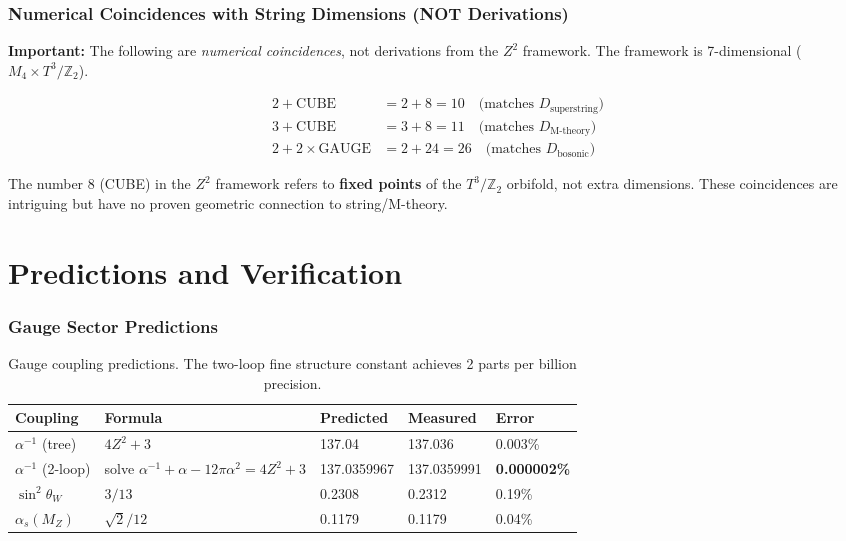 \documentclass[11pt,a4paper]{article}
\theoremstyle{plain}
\theoremstyle{definition}
\theoremstyle{remark}
\newcommand{\MZ}{M_Z}
\newcommand{\alphas}{\alpha_s}
\newcommand{\thetaW}{\theta_W}
\newcommand{\CUBE}{\text{CUBE}}
\newcommand{\GAUGE}{\text{GAUGE}}
\begin{document}
\section{Numerical Coincidences with String Dimensions (NOT Derivations)}

\textbf{Important:} The following are \emph{numerical coincidences}, not derivations from the $Z^2$ framework. The framework is 7-dimensional ($M_4 \times T^3/\mathbb{Z}_2$).

\begin{align}
2 + \CUBE &= 2 + 8 = 10 \quad \text{(matches } D_{\text{superstring}}\text{)} \\
3 + \CUBE &= 3 + 8 = 11 \quad \text{(matches } D_{\text{M-theory}}\text{)} \\
2 + 2 \times \GAUGE &= 2 + 24 = 26 \quad \text{(matches } D_{\text{bosonic}}\text{)}
\end{align}

The number 8 (CUBE) in the $Z^2$ framework refers to \textbf{fixed points} of the $T^3/\mathbb{Z}_2$ orbifold, not extra dimensions. These coincidences are intriguing but have no proven geometric connection to string/M-theory.

\part{Predictions and Verification}

\section{Gauge Sector Predictions}

\begin{table}[h!]
\centering
\begin{tabular}{lllll}
\toprule
\textbf{Coupling} & \textbf{Formula} & \textbf{Predicted} & \textbf{Measured} & \textbf{Error} \\
\midrule
$\alpha^{-1}$ (tree) & $4Z^2 + 3$ & 137.04 & 137.036 & 0.003\% \\
$\alpha^{-1}$ (2-loop) & solve $\alpha^{-1} + \alpha - 12\pi\alpha^2 = 4Z^2 + 3$ & 137.0359967 & 137.0359991 & \textbf{0.000002\%} \\
$\sin^2\thetaW$ & $3/13$ & 0.2308 & 0.2312 & 0.19\% \\
$\alphas(\MZ)$ & $\sqrt{2}/12$ & 0.1179 & 0.1179 & 0.04\% \\
\bottomrule
\end{tabular}
\caption{Gauge coupling predictions. The two-loop fine structure constant achieves 2 parts per billion precision.}
\end{table}
\end{document}
